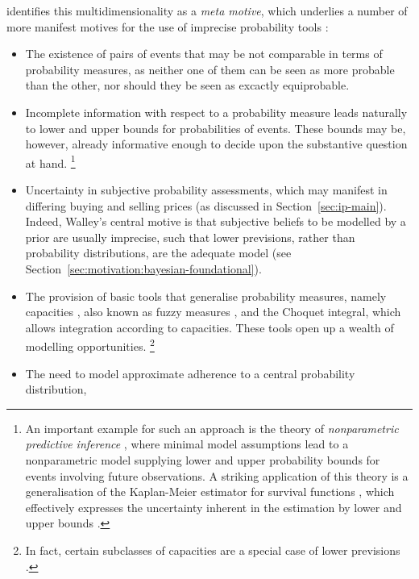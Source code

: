 \textcite[\S 1.4]{2001:weichselberger} identifies this multidimensionality as a \emph{meta motive},
which underlies a number of more manifest motives for the use of imprecise probability tools
\parencite[p.~92]{2001:weichselberger}:
\begin{itemize}
\item The existence of pairs of events that may be not comparable in terms of probability measures,
as neither one of them can be seen as more probable than the other,
nor should they be seen as excactly equiprobable.
\item Incomplete information with respect to a probability measure
leads naturally to lower and upper bounds for probabilities of events.
These bounds may be, however, already informative enough to decide upon
the substantive question at hand.%
\footnote{\label{foot:npi}An important example for such an approach is the theory of \emph{nonparametric predictive inference}
\parencite[NPI, see ][]{2011:IESS-npi}, where minimal model assumptions %
lead to a nonparametric model supplying lower and upper probability bounds for events
involving future observations.
A striking application of this theory is a generalisation of the
Kaplan-Meier estimator for survival functions \parencite{1958:kaplan},
which effectively expresses the uncertainty inherent in the estimation
by lower and upper bounds \parencite{2004:Coolen:Yan}.}
\item Uncertainty in subjective probability assessments,
which may manifest in differing buying and selling prices
(as discussed in Section~\ref{sec:ip-main}).
Indeed, Walley's \parencite*{1991:walley} central motive is that
subjective beliefs to be modelled by a prior are usually imprecise,
such that lower previsions, rather than probability distributions,
are the adequate model (see Section~\ref{sec:motivation:bayesian-foundational}).
\item The provision of basic tools that generalise probability measures,
namely capacities \parencite{1954:choquet}, also known as fuzzy measures \parencite[e.g.,][]{1989:murofushi},
and the Choquet integral, which allows integration according to capacities.
These tools open up a wealth of modelling opportunities.%
\footnote{In fact, certain subclasses of capacities are a special case of lower previsions \parencite[see, e.g.,][Fig.~5.5]{itip-special}.}
\item The need to model approximate adherence to a central probability distribution,

\end{itemize}
